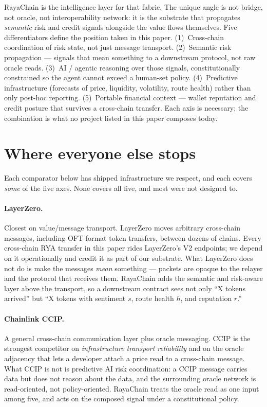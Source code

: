 \documentclass[11pt,a4paper]{article}
\begin{document}
RayaChain is the intelligence layer for that fabric. The unique angle
is not bridge, not oracle, not interoperability network: it is the
substrate that propagates \emph{semantic} risk and credit signals
alongside the value flows themselves. Five differentiators define the
position taken in this paper. (1)~Cross-chain coordination of risk
state, not just message transport. (2)~Semantic risk
propagation --- signals that mean something to a downstream protocol,
not raw oracle reads. (3)~AI / agentic reasoning over those signals,
constitutionally constrained so the agent cannot exceed a human-set
policy. (4)~Predictive infrastructure (forecasts of price, liquidity,
volatility, route health) rather than only post-hoc reporting.
(5)~Portable financial context --- wallet reputation and credit
posture that survives a cross-chain transfer. Each axis is necessary;
the combination is what no project listed in this paper composes
today.

\section*{Where everyone else stops}
\label{sec:comparators}

Each comparator below has shipped infrastructure we respect, and each
covers \emph{some} of the five axes. None covers all five, and most
were not designed to.

\paragraph{LayerZero.} Closest on value/message transport. LayerZero
moves arbitrary cross-chain messages, including OFT-format token
transfers, between dozens of chains. Every cross-chain RYA transfer in
this paper rides LayerZero's V2 endpoints; we depend on it operationally
and credit it as part of our substrate. What LayerZero does not do is
make the messages \emph{mean} something --- packets are opaque to the
relayer and the protocol that receives them. RayaChain adds the
semantic and risk-aware layer above the transport, so a downstream
contract sees not only ``X tokens arrived'' but ``X tokens with
sentiment $s$, route health $h$, and reputation $r$.''

\paragraph{Chainlink CCIP.} A general cross-chain communication layer
plus oracle messaging. CCIP is the strongest competitor on
\emph{infrastructure transport reliability} and on the oracle adjacency
that lets a developer attach a price read to a cross-chain message.
What CCIP is not is predictive AI risk coordination: a CCIP message
carries data but does not reason about the data, and the surrounding
oracle network is read-oriented, not policy-oriented. RayaChain treats
the oracle read as one input among five, and acts on the composed
signal under a constitutional policy.
\end{document}
